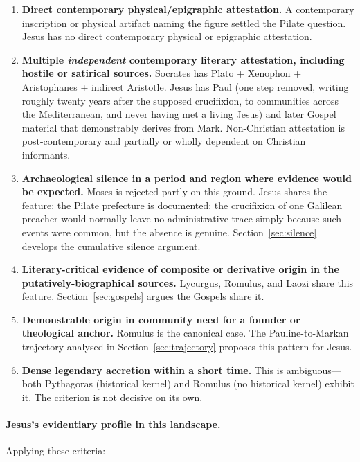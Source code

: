 \documentclass[12pt,oneside]{article}
\begin{document}
\begin{enumerate}[leftmargin=2em]
\item \textbf{Direct contemporary physical/epigraphic attestation.}
  A contemporary inscription or physical artifact naming the figure
  settled the Pilate question.  Jesus has no direct contemporary
  physical or epigraphic attestation.
\item \textbf{Multiple \textit{independent} contemporary literary
  attestation, including hostile or satirical sources.}  Socrates
  has Plato + Xenophon + Aristophanes + indirect Aristotle.
  Jesus has Paul (one step removed, writing roughly twenty years
  after the supposed crucifixion, to communities across the
  Mediterranean, and never having met a living Jesus) and later
  Gospel material that demonstrably derives from Mark.  Non-Christian
  attestation is post-contemporary and partially or wholly dependent
  on Christian informants.
\item \textbf{Archaeological silence in a period and region where
  evidence would be expected.}  Moses is rejected partly on this
  ground.  Jesus shares the feature: the Pilate prefecture is
  documented; the crucifixion of one Galilean preacher would normally
  leave no administrative trace simply because such events were
  common, but the absence is genuine.  Section~\ref{sec:silence}
  develops the cumulative silence argument.
\item \textbf{Literary-critical evidence of composite or derivative
  origin in the putatively-biographical sources.}  Lycurgus,
  Romulus, and Laozi share this feature.  Section~\ref{sec:gospels}
  argues the Gospels share it.
\item \textbf{Demonstrable origin in community need for a founder or
  theological anchor.}  Romulus is the canonical case.  The
  Pauline-to-Markan trajectory analysed in
  Section~\ref{sec:trajectory} proposes this pattern for Jesus.
\item \textbf{Dense legendary accretion within a short time.}  This
  is ambiguous---both Pythagoras (historical kernel) and Romulus
  (no historical kernel) exhibit it.  The criterion is not
  decisive on its own.
\end{enumerate}

\paragraph{Jesus's evidentiary profile in this landscape.}
Applying these criteria:
\end{document}
